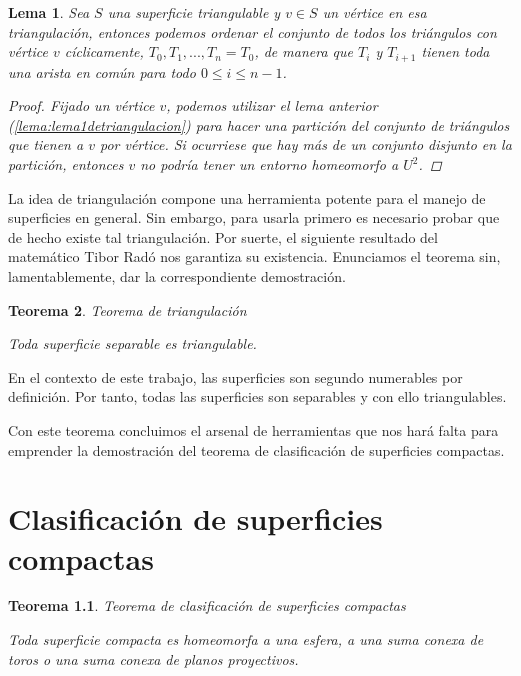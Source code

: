 \documentclass[a4paper,11pt,spanish, twoside, leqno]{tfg-uam}
\newtheorem{teor}{Teorema}[chapter]
\newtheorem{lema}[teor]{Lema}
\theoremstyle{definition}
\begin{document}
\begin{lema}\label{lema:lema2detriangulacion}
Sea  $S$ una superficie triangulable y $v\in S$ un vértice en esa triangulación, entonces podemos ordenar el conjunto de todos los triángulos con vértice $v$ cíclicamente,  $T_0, T_1, ..., T_n = T_0$, de manera que $T_i$ y $T_{i+1}$ tienen toda una arista en común para todo $0\leq i\leq n-1$.

\begin{proof}
Fijado un vértice $v$, podemos utilizar el lema anterior (\ref{lema:lema1detriangulacion}) para hacer una partición del conjunto de triángulos que tienen a $v$ por vértice. Si ocurriese que hay más de un conjunto disjunto en la partición, entonces $v$ no podría tener un entorno homeomorfo a $U^2$.
\end{proof}

\end{lema}

La idea de triangulación compone una herramienta potente para el manejo de superficies en general. Sin embargo, para usarla primero es necesario probar que de hecho existe  tal triangulación. Por suerte, el siguiente resultado del matemático Tibor Radó nos garantiza su existencia. Enunciamos el teorema sin, lamentablemente, dar la correspondiente demostración.

\begin{teor}{Teorema de triangulación}\label{teor:teoremaDeTriangulacion}	

Toda superficie separable es triangulable.
\end{teor}
En el contexto de este trabajo, las superficies son segundo numerables por definición. Por tanto, todas las superficies son separables y con ello triangulables.

Con este teorema concluimos el arsenal de herramientas que nos hará falta para emprender la demostración del teorema de clasificación de superficies compactas.





\chapter{Clasificación de superficies compactas}
\label{chap:clasifcompacta}
\begin{teor}{Teorema de clasificación de superficies compactas}\label{teor:teoremadeclasificacion}	

Toda superficie compacta es homeomorfa a una esfera, a una suma conexa de toros o una suma conexa de planos proyectivos.
\end{teor}
\end{document}
